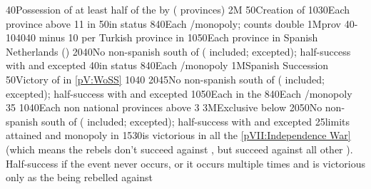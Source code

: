 %
%
%
{}{40}{Possession of at least half of the \payshongrie by \AUSaus (
  provinces)}%
%
\EUobjective2M{}{}%
{}{50}{Creation of }%
%
%
{10}{30}{Each province above 11 in \AUSaus}%
%
%
{}{50}{\paysportugal in \ANNEXION status}%
%
%
{8}{40}{Each \CTZ/\STZ monopoly;  counts double}%
%
%
\EUobjective1M{\payshongrie}{\TUR prov}%
{40-10}{40}{40 \VPs minus 10 \VPs per Turkish province in \payshongrie}%
%
%
{10}{50}{Each province in Spanish Netherlands (\regionBelgique)}%
%
%
{20}{40}{No non-spanish \COL south of 
  ( included;  excepted); half-success
  with  and  excepted}%
%
%
{}{40}{\paysportugal in \ANNEXION status}%
%
%
{8}{40}{Each \CTZ/\STZ monopoly}%
%
%
\EUobjective1M{Spanish Succession}{}%
{}{50}{Victory of \SPA in \ref{pV:WoSS}}%
%
%
{10}{40}{}%
%
%
{20}{45}{No non-spanish \COL south of 
  ( included;  excepted); half-success
  with  and  excepted}%
%
%
{10}{50}{Each \Presidio in the }%
%
%
{8}{40}{Each \CTZ/\STZ monopoly}%
%
%
%
{}{35}{}%
%
%
{10}{40}{Each non national provinces above 3}%
%
\EUobjective3M{Exclusive below }{}%
{20}{50}{No non-spanish \COL south of 
  ( included;  excepted); half-success
  with  and  excepted}%
%
%
{}{25}{\MNU limits attained and monopoly in }%
%
%
{15}{30}{\SPA is victorious in all the \ref{pVII:Independence War} (which
  means the rebels don't succeed against \SPA, but succeed against all other
  \MAJ). Half-success if the event never occurs, or it occurs multiple times
  and \SPA is victorious only as the \MAJ being rebelled against }%
